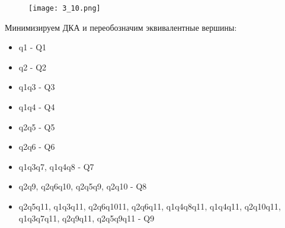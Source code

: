\documentclass[12pt, a4paper]{article}
\begin{document}
\begin{enumerate}
\begin{comment}
    "" -> q1
    q1 -> q2 [label="a, b"]
    q2 -> "{q1q3}" [label="a"]
    q2 -> "{q1q4}" [label="b"]
    "{q1q3}" -> "{q2q9}" [label="a"]
    "{q1q3}" -> "{q2q5}" [label="b"]
    "{q2q5}" -> "{q1q3q7}" [label="a"]
    "{q2q5}" -> "{q1q4}" [label="b"]
    "{q1q4}" -> "{q2q6}" [label="a"]
    "{q1q4}" -> "{q2q10}" [label="b"]
    "{q2q6}" -> "{q1q3}" [label="a"]
    "{q2q6}" -> "{q1q4q8}" [label="b"]
    "{q1q4q8}" -> "{q2q6q10}" [label="a"]
    "{q1q4q8}" -> "{q2q10}" [label="b"]
    "{q2q6q10}" -> "{q1q3q11}" [label="a"]
    "{q2q6q10}" -> "{q1q4q8q11}" [label="b"]
    "{q2q10}" -> "{q1q3q11}" [label="a"]
    "{q2q10}" -> "{q1q4q11}" [label="b"]
    "{q1q3q7}" -> "{q2q9}" [label="a"]
    "{q1q3q7}" -> "{q2q5q9}" [label="b"]
    "{q2q9}" -> "{q1q3q11}" [label="a"]
    "{q2q9}" -> "{q1q4q11}" [label="b"]
    "{q1q3q11}" -> "{q2q9q11}" [label="a"]
    "{q1q3q11}" -> "{q2q5q11}" [label="b"]
    "{q2q5q11}" -> "{q1q3q7q11}" [label="a"]
    "{q2q5q11}" -> "{q1q4q11}" [label="b"]
    "{q2q5q9}" -> "{q1q4q11}" [label="b"]
    "{q2q5q9}" -> "{q1q3q7q11}" [label="a"]
    "{q2q5q9}" -> "{q1q4q11}" [label="b"]
    "{q1q3q7q11}" -> "{q2q9q11}" [label="a"]
    "{q1q3q7q11}" -> "{q2q5q9q11}" [label="b"]
    "{q2q9q11}" -> "{q1q4q11}" [label="b"]
    "{q2q5q9q11}" -> "{q1q3q7q11}" [label="a"]
    "{q2q5q9q11}" -> "{q1q4q11}" [label="b"]
    "{q1q4q11}" -> "{q2q6q11}" [label="a"]
    "{q1q4q11}" -> "{q2q10q11}" [label="b"]
    "{q2q6q11}" -> "{q1q4q8q11}" [label="b"]
    "{q1q4q8q11}" -> "{q2q6q10q11}" [label="a"]
    "{q1q4q8q11}" -> "{q2q10q11}" [label="b"]
    "{q2q6q10q11}" -> "{q1q3q11}" [label="a"]
    "{q2q6q10q11}" -> "{q1q4q8q11}" [label="b"]
    "{q2q10q11}" -> "{q1q3q11}" [label="a"]
    "{q2q10q11}" -> "{q1q4q11}" [label="b"]
}
\end{comment}

    \begin{figure}[H]
        \centering
        \texttt{[image: 3\_10.png]}
    \end{figure}

Минимизируем ДКА и переобозначим эквивалентные вершины:
\begin{itemize}
    \item q1 - Q1
    \item q2 - Q2
    \item {q1q3} - Q3
    \item {q1q4} - Q4
    \item {q2q5} - Q5
    \item {q2q6} - Q6
    \item {q1q3q7}, {q1q4q8} - Q7
    \item {q2q9}, {q2q6q10}, {q2q5q9}, {q2q10} - Q8
    \item {q2q5q11}, {q1q3q11}, {q2q6q1011}, {q2q6q11}, {q1q4q8q11}, {q1q4q11}, {q2q10q11}, {q1q3q7q11}, {q2q9q11}, {q2q5q9q11} - Q9
\end{itemize}


\end{enumerate}
\end{document}
